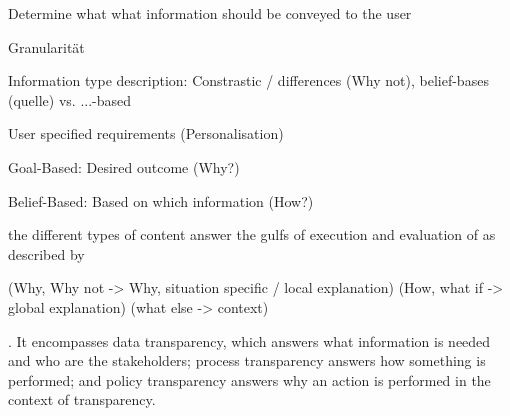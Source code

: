 Determine what what information should be conveyed to the user \cite{nunes_systematic_2017}

Granularität

Information type description: Constrastic / differences (Why not), belief-bases (quelle) vs. ...-based

User specified requirements (Personalisation) \cite{tintarev_designing_nodate, sokol_explainability_2020}

Goal-Based: Desired outcome (Why?) \cite{kaptein_personalised_2017, abdulrahman_belief-based_2019}

Belief-Based: Based on which information (How?) \cite{kaptein_personalised_2017, abdulrahman_belief-based_2019}

the different types of content answer the gulfs of execution and evaluation of \cite{norman1988psychology} as described by \cite{ribera2019can}

(Why, Why not -> Why, situation specific / local explanation) (How, what if -> global explanation) (what else -> context) \cite{lim_2009_assessing}

. It encompasses data transparency, which answers what information is needed and who are the stakeholders; process transparency answers how something is performed; and policy transparency answers why an action is performed in the context of transparency. \cite{chazette2020explainability}

